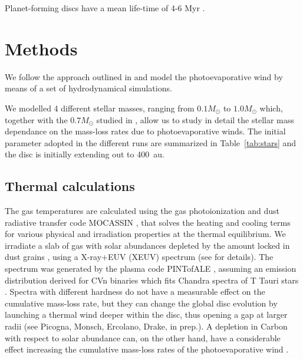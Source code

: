 \documentclass{aa}
\begin{document}
Planet-forming discs have a mean life-time of 4-6 Myr .

\section{Methods}
We follow the approach outlined in  and model the photoevaporative wind by means of a set of hydrodynamical simulations.

We modelled 4 different stellar masses, ranging from $0.1 M_\odot$ to $1.0 M_\odot$ which, together with the $0.7 M_\odot$ studied in , allow us to study in detail the stellar mass dependance on the mass-loss rates due to photoevaporative winds.
The initial parameter adopted in the different runs are summarized in Table~\ref{tab:stars} and the disc is initially extending out to \SI{400}{au}.

\subsection{Thermal calculations}
The gas temperatures are calculated using the gas photoionization and dust radiative transfer code \textsc{MOCASSIN} , that solves the heating and cooling terms for various physical and irradiation properties at the thermal equilibrium.
We irradiate a slab of gas with solar abundances  depleted by the amount locked in dust grains \citep{1996ApJ...470..893S}, using a X-ray+EUV (XEUV) spectrum (see  for details).
The spectrum was generated by the plasma code PINTofALE , assuming an emission distribution derived for CVn binaries  which fits Chandra spectra of T Tauri stars .
Spectra with different hardness do not have a measurable effect on the cumulative mass-loss rate, but they can change the global disc evolution by launching a thermal wind deeper within the disc, thus opening a gap at larger radii (see Picogna, Monsch, Ercolano, Drake, in prep.).
A depletion in Carbon with respect to solar abundance can, on the other hand, have a considerable effect increasing the cumulative mass-loss rates of the photoevaporative wind .
\end{document}
